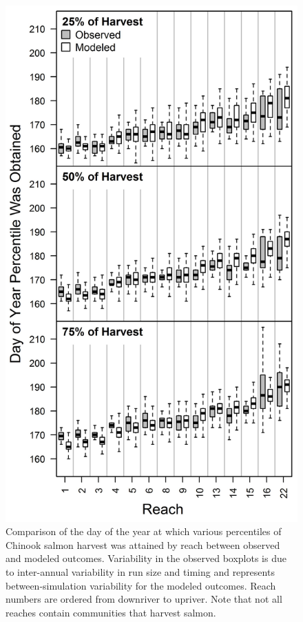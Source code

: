 \documentclass[12pt,]{book}
\theoremstyle{definition}
\theoremstyle{definition}
\theoremstyle{definition}
\theoremstyle{remark}
\begin{document}
\clearpage

\begin{figure}
  \centering
  \includegraphics{img/Ch3/Figure B3.jpg}
  \caption{Comparison of the day of the year at which various percentiles of Chinook salmon harvest was attained by reach between observed and modeled outcomes. Variability in the observed boxplots is due to inter-annual variability in run size and timing and represents between-simulation variability for the modeled outcomes. Reach numbers are ordered from downriver to upriver. Note that not all reaches contain communities that harvest salmon.}
  \label{fig:temporal-harvest}
\end{figure}
\end{document}

